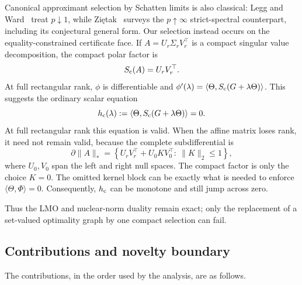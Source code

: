Canonical approximant selection by Schatten limits is also classical:
Legg and Ward~\cite{legg1985canonical} treat \(p\downarrow1\), while
Zi\k{e}tak~\cite{zietak2017strict} surveys the \(p\uparrow\infty\) strict-spectral
counterpart, including its conjectural general form.  Our selection instead
occurs on the equality-constrained certificate face.
If \(A=U_r\Sigma_rV_r^\top\) is a compact singular value decomposition,
the compact polar factor is
\begin{equation}
 S_{\mathrm c}(A)=U_rV_r^\top.
 \label{eq:compact-polar}
\end{equation}
At full rectangular rank, \(\phi\) is differentiable and
\(\phi'(\lambda)=\langle\Theta,S_{\mathrm c}(G+\lambda\Theta)\rangle\).  This suggests
the ordinary scalar equation
\begin{equation}
 h_{\rm c}(\lambda):=
 \langle\Theta,S_{\mathrm c}(G+\lambda\Theta)\rangle=0.
 \label{eq:compact-root}
\end{equation}
At full rectangular rank this equation is valid.  When the affine matrix loses
rank, it need not remain valid, because the complete subdifferential is
\begin{equation}
 \partial\|A\|_*
 =\left\{
 U_rV_r^\top+U_0KV_0^\top:\ \|K\|_2\le1
 \right\},
 \label{eq:full-subdiff}
\end{equation}
where \(U_0,V_0\) span the left and right null spaces.  The compact factor is
only the choice \(K=0\).  The omitted kernel block can be exactly what is
needed to enforce \(\langle\Theta,\Phi\rangle=0\).  Consequently,
\(h_{\rm c}\) can be monotone and still jump across zero.

Thus the LMO and nuclear-norm duality remain exact; only the replacement of a
set-valued optimality graph by one compact selection can fail.

\subsection{Contributions and novelty boundary}

The contributions, in the order used by the analysis, are as follows.

